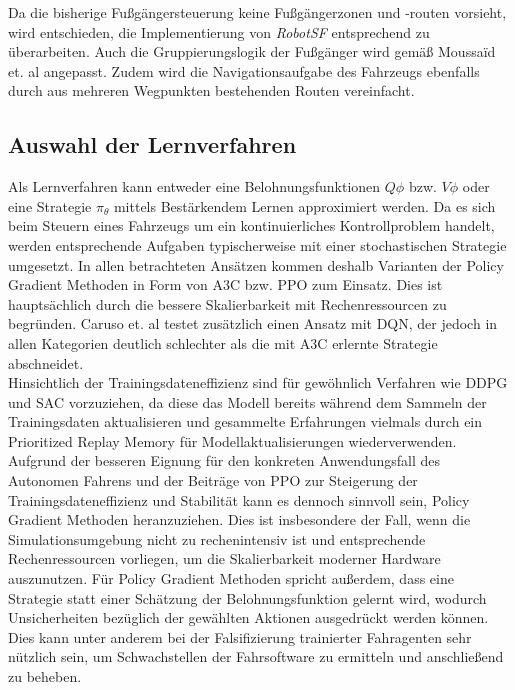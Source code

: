 Da die bisherige Fußgängersteuerung keine Fußgängerzonen und -routen vorsieht, wird entschieden,
die Implementierung von \emph{RobotSF} entsprechend zu überarbeiten. Auch die Gruppierungslogik
der Fußgänger wird gemäß Moussaïd et. al \cite{moussaid2010groupssf} angepasst.
Zudem wird die Navigationsaufgabe des Fahrzeugs ebenfalls durch aus mehreren Wegpunkten
bestehenden Routen vereinfacht.

\subsection{Auswahl der Lernverfahren}
Als Lernverfahren kann entweder eine Belohnungsfunktionen $Q\phi$ bzw. $V\phi$ oder
eine Strategie $\pi_\theta$ mittels Bestärkendem Lernen approximiert werden.
Da es sich beim Steuern eines Fahrzeugs um ein kontinuierliches Kontrollproblem handelt,
werden entsprechende Aufgaben typischerweise mit einer stochastischen Strategie umgesetzt.
In allen betrachteten Ansätzen kommen deshalb Varianten der Policy Gradient Methoden
in Form von A3C bzw. PPO zum Einsatz. Dies ist hauptsächlich durch die bessere Skalierbarkeit
mit Rechenressourcen zu begründen. Caruso et. al \cite{machines11020268} testet zusätzlich
einen Ansatz mit DQN, der jedoch in allen Kategorien deutlich schlechter als die mit A3C
erlernte Strategie abschneidet.\\

Hinsichtlich der Trainingsdateneffizienz sind für gewöhnlich Verfahren wie DDPG und SAC
\cite{Kiran2022survey} vorzuziehen, da diese das Modell bereits während dem Sammeln der
Trainingsdaten aktualisieren und gesammelte Erfahrungen vielmals durch ein Prioritized
Replay Memory für Modellaktualisierungen wiederverwenden. Aufgrund der besseren Eignung
für den konkreten Anwendungsfall des Autonomen Fahrens und der Beiträge von PPO zur
Steigerung der Trainingsdateneffizienz und Stabilität kann es dennoch sinnvoll sein,
Policy Gradient Methoden heranzuziehen. Dies ist insbesondere der Fall, wenn die
Simulationsumgebung nicht zu rechenintensiv ist und entsprechende Rechenressourcen vorliegen,
um die Skalierbarkeit moderner Hardware auszunutzen.
Für Policy Gradient Methoden spricht außerdem, dass eine
Strategie statt einer Schätzung der Belohnungsfunktion gelernt wird, wodurch Unsicherheiten
bezüglich der gewählten Aktionen ausgedrückt werden können. Dies kann unter anderem bei der
Falsifizierung trainierter Fahragenten sehr nützlich sein, um Schwachstellen der Fahrsoftware
zu ermitteln und anschließend zu beheben.\\

